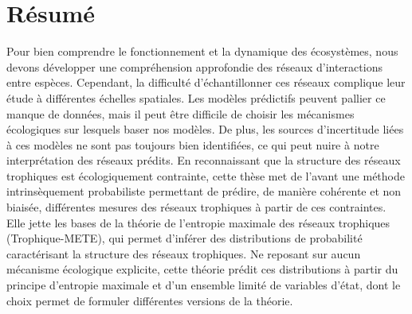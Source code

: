 \documentclass[12pt,twoside,phd]{dms}
\numberwithin{equation}{section}
\numberwithin{table}{chapter}
\numberwithin{figure}{chapter}
\begin{document}
\maketitle
\newpage
\maketitle

\doublespacing


\francais

\setlength{\parskip}{6pt} %

\chapter*{Résumé}

Pour bien comprendre le fonctionnement et la dynamique des écosystèmes, nous
devons développer une compréhension approfondie des réseaux d'interactions entre
espèces. Cependant, la difficulté d'échantillonner ces réseaux complique leur
étude à différentes échelles spatiales. Les modèles prédictifs peuvent pallier
ce manque de données, mais il peut être difficile de choisir les mécanismes
écologiques sur lesquels baser nos modèles. De plus, les sources d'incertitude
liées à ces modèles ne sont pas toujours bien identifiées, ce qui peut nuire à
notre interprétation des réseaux prédits. En reconnaissant que la structure des
réseaux trophiques est écologiquement contrainte, cette thèse met de l'avant une
méthode intrinsèquement probabiliste permettant de prédire, de manière cohérente
et non biaisée, différentes mesures des réseaux trophiques à partir de ces
contraintes. Elle jette les bases de la théorie de l'entropie maximale des
réseaux trophiques (Trophique-METE), qui permet d'inférer des distributions de
probabilité caractérisant la structure des réseaux trophiques. Ne reposant sur
aucun mécanisme écologique explicite, cette théorie prédit ces distributions à
partir du principe d'entropie maximale et d'un ensemble limité de variables
d'état, dont le choix permet de formuler différentes versions de la théorie. 
\end{document}
